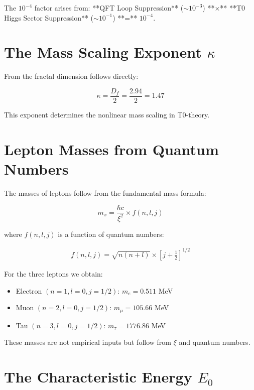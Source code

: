 The $10^{-4}$ factor arises from: **QFT Loop Suppression** ($\sim 10^{-3}$) **×** **T0 Higgs Sector Suppression** ($\sim 10^{-1}$) **=** $10^{-4}$.

	\section{The Mass Scaling Exponent $\kappa$}
	
	From the fractal dimension follows directly:
	
	\begin{equation}
		\kappa = \frac{D_f}{2} = \frac{2.94}{2} = 1.47
	\end{equation}
	
	This exponent determines the nonlinear mass scaling in T0-theory.
	
	\section{Lepton Masses from Quantum Numbers}
	
	The masses of leptons follow from the fundamental mass formula:
	
	\begin{equation}
		m_x = \frac{\hbar c}{\xi^2} \times f(n, l, j)
	\end{equation}
	
	where $f(n, l, j)$ is a function of quantum numbers:
	
	\begin{align}
		f(n, l, j) = \sqrt{n(n+l)} \times \left[j + \frac{1}{2}\right]^{1/2}
	\end{align}
	
	For the three leptons we obtain:
	
	\begin{itemize}
		\item Electron $(n=1, l=0, j=1/2)$: $m_e = 0.511$ MeV
		\item Muon $(n=2, l=0, j=1/2)$: $m_\mu = 105.66$ MeV
		\item Tau $(n=3, l=0, j=1/2)$: $m_\tau = 1776.86$ MeV
	\end{itemize}
	
	These masses are not empirical inputs but follow from $\xi$ and quantum numbers.
	
	\section{The Characteristic Energy $E_0$}
	
